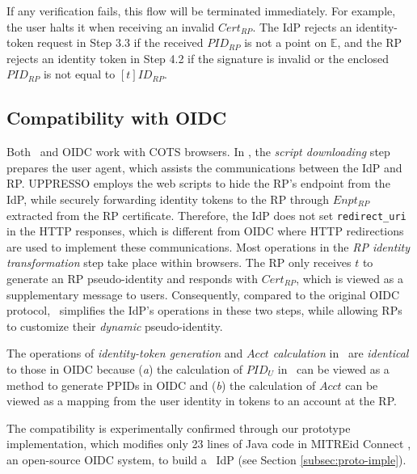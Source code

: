 If any verification fails, this flow will be terminated immediately.
For example, the user halts it when receiving an invalid $Cert_{RP}$.
\newc
The IdP rejects an identity-token request in Step 3.3 if the received $PID_{RP}$ is not a point on $\mathbb{E}$, and the RP rejects an identity token in Step 4.2 if the signature is invalid or the enclosed $PID_{RP}$ is not equal to $[t]ID_{RP}$.
\oldc


\subsection{Compatibility with OIDC}
\label{subsec:compatible}

Both \usso~and OIDC work with COTS browsers. %
In \usso, the \emph{script downloading} step prepares the user agent, which assists the communications between the IdP and RP. UPPRESSO employs the web scripts to hide the RP's endpoint from the IdP, while securely forwarding identity tokens to the RP through $Enpt_{RP}$ extracted from the RP certificate.
Therefore, the IdP does not set \verb+redirect_uri+ in the HTTP responses, which is different from OIDC where HTTP redirections are used to implement these communications. Most operations in the \emph{RP identity transformation} step take place within browsers. The RP only receives $t$ to generate an RP pseudo-identity and responds with $Cert_{RP}$,
which is viewed as a supplementary message to users.
Consequently, compared to the original OIDC protocol, \usso~simplifies the IdP's operations in these two steps, while allowing RPs to customize their \emph{dynamic} pseudo-identity.

The operations of \emph{identity-token generation} and \emph{$Acct$ calculation} in \usso~are \emph{identical} to those in OIDC because (\emph{a}) the calculation of $PID_U$ in \usso~can be viewed as a method to generate PPIDs in OIDC and (\emph{b}) the calculation of $Acct$ can be viewed as a mapping from the user identity in tokens to an account at the RP.

The compatibility is experimentally confirmed through our prototype implementation, which modifies only 23 lines of Java code in MITREid Connect \cite{MITREid}, an open-source OIDC system, to build a \usso~IdP (see Section \ref{subsec:proto-imple}).

